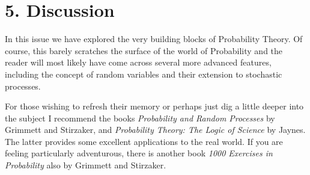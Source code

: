 \documentclass[11pt]{article}
\begin{document}
\section*{5. Discussion}
In this issue we have explored the very building blocks of Probability Theory. Of course, this barely scratches the surface of the world of Probability and the reader will most likely have come across several more advanced features, including the concept of random variables and their extension to stochastic processes. 

For those wishing to refresh their memory or perhaps just dig a little deeper into the subject I recommend the books \textit{Probability and Random Processes} by Grimmett and Stirzaker, and \textit{Probability Theory: The Logic of Science} by Jaynes. The latter provides some excellent applications to the real world. If you are feeling particularly adventurous, there is another book \textit{1000 Exercises in Probability} also by Grimmett and Stirzaker. 
\end{document}
